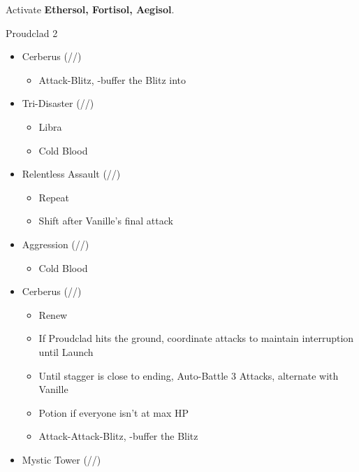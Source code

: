 Activate \textbf{Ethersol, Fortisol, Aegisol}.
\renewcommand{\first}{[1] Aggression (\rav/\com/\com)}
\renewcommand{\second}{[2] Cerberus (\com/\com/\com)}
\renewcommand{\third}{[3] Mystic Tower (\rav/\sen/\rav)}
\renewcommand{\fourth}{[4] Solidarity (\com/\sen/\med)}
\renewcommand{\fifth}{[5] Relentless Assault (\rav/\com/\rav)}
\renewcommand{\sixth}{[6] Tri-Disaster (\rav/\rav/\rav)}
\begin{battle}[2:01]{Proudclad 2}
	\begin{multicols}{2}
		\begin{itemize}
			\item \second
			      \begin{itemize}
				      \item Attack-Blitz, \rav-buffer the Blitz into
			      \end{itemize}
			\item \sixth
			      \begin{itemize}
				      \item Libra
				      \item Cold Blood
			      \end{itemize}
			\item \fifth
			      \begin{itemize}
				      \item Repeat
				      \item Shift after Vanille's final attack
			      \end{itemize}
			\item \first
			      \begin{itemize}
				      \item Cold Blood
			      \end{itemize}
			\item \second
			      \begin{itemize}
				      \item Renew
				      \item If Proudclad hits the ground, coordinate attacks to maintain interruption until Launch
				      \item Until stagger is close to ending, Auto-Battle 3 Attacks, alternate with Vanille
				      \item Potion if everyone isn't at max HP
				      \item Attack-Attack-Blitz, \rav-buffer the Blitz
			      \end{itemize}
			\item \third
			      \begin{itemize}

\end{itemize}
\end{itemize}
\end{multicols}
\end{battle}

